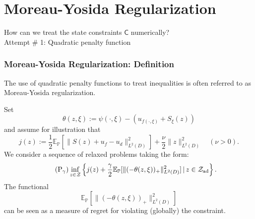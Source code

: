 \documentclass[aspectratio=169,xcolor=dvipsnames,11pt]{beamer}
\newcommand{\eqdef}{:=}
\newcommand{\setC}{\mathsf{C}}
\newcommand{\setZ}{\mathcal{Z}}
\begin{document}
\begin{footnotesize}
\begin{frame}
\end{frame}

\section{Moreau-Yosida Regularization}
\begin{frame}[noframenumbering]\thispagestyle{empty}
\vspace*{\fill}
\begin{center}
\Large 
How can we treat the state constraints $\setC$ numerically?\\
\pause
Attempt \# 1: Quadratic penalty function
\end{center}
\vspace*{\fill}
\end{frame}

\begin{frame}\frametitle{Moreau-Yosida Regularization: Definition}
\begin{center}
The use of quadratic penalty functions to treat inequalities is often referred to as 
Moreau-Yosida regularization.
\end{center}
\begin{block}{}
Set
\[
\theta(z,\xi)\eqdef \psi(\cdot,\xi)-(u_{f(\cdot,\xi)}+S_{\xi}(z))
\]
and assume for illustration that
\[
j(z) := \frac{1}{2} \mathbb E_{\mathbb P}[\| S(z) + u_f - u_{d} \|^2_{L^2(D)}] + \frac{\nu}{2} \| z \|^2_{L^2(D)} \quad (\nu > 0).
\]
We consider a sequence of relaxed problems taking the form:
\begin{equation}\label{P-gamma}\tag{P$_\gamma$}
  \inf_{z\in\setZ}\left\{ j(z) + \frac{\gamma}{2} \mathbb E_{\mathbb P}[\| (-\theta(z,\xi))_+\|^2_{L^2(D)}] \,\vert\,  z\in\setZ_{\rm ad} \right\}.
\end{equation}
The functional
\[
 \mathbb E_{\mathbb P}[\| (-\theta(z,\xi))_+\|^2_{L^2(D)}] 
\]
can be seen as a measure of regret for violating (globally) the constraint.
\end{block}
\end{frame}


\end{footnotesize}
\end{document}
